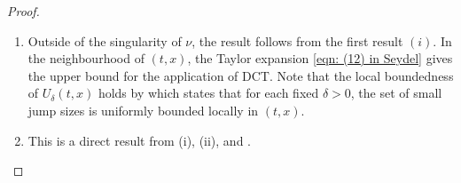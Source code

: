 \begin{proof}
\begin{enumerate}[label=(\roman*)]
        For the LSC case, we have
        \begin{align*}
            & \liminf_{k \rightarrow \infty} \mathcal{I}^{2,\delta}[t_k,x_k,p_k,v(t_k,\cdot)] \\
            &\quad =\liminf_{k \rightarrow \infty} \int\limits_{|z| \geq \delta} \big( v(t_k,x_k+\gamma(t_k,x_k,z)) - v(t_k,x_k) - \langle p_k, \gamma(t_k,x_k,z) \rangle \ind{|z| < 1} \big) \nu (\diff z) \\
            &\quad \geq \int\limits_{|z| \geq \delta} \liminf_{k \rightarrow \infty} \big( v(t_k,x_k+\gamma(t_k,x_k,z)) - v(t_k,x_k) - \langle p_k, \gamma(t_k,x_k,z) \rangle \ind{|z| < 1} \big) \nu(\diff z) \\
            &\quad = \int\limits_{|z| \geq \delta} \big( v(t,x+\gamma(t,x,z)) - v(t,z) - \langle p, \gamma(t,x,z) \rangle \ind{|z|>1} \big) \nu(\diff z) \\
            &\quad = \mathcal{I}^{2,\delta} [t,x,p,v(t,\cdot)]. 
        \end{align*}
        where the inequality results from the direct application of Fatou's Lemma. 

        For the second assertion, the result for $\varphi_k$ follows from the monotonous property of $\{\varphi_k\}_{k \geq 0}$ and the assumption that $\varphi_k$ converges pointwise to $u$. Applying Dini's Theorem, see {\cite[Theorem 7.3]{dibenedetto2002real}}, one finds that the convergence is uniform, which results in 
        \begin{equation*}
            \limsup_{k \rightarrow \infty} \varphi_k(t_k,x_k) \leq u(t,x),
        \end{equation*}
        and 
        \begin{equation*}
            \limsup_{k \rightarrow \infty} \varphi_k(t_k,x_k + \gamma(t_k,x_k,z)) \leq u(t,x).
        \end{equation*}
        Hence \eqref{eqn: (33) in Seydel} holds. A similar logic is applied to obtain \eqref{eqn: (34) in Seydel}. 

    \item Outside of the singularity of  $\nu$, the result follows from the first result $(i)$. In the neighbourhood of $(t,x)$, the Taylor expansion \eqref{eqn: (12) in Seydel} gives the upper bound for the application of DCT. Note that the local boundedness of $U_\delta(t,x)$ holds by  which states that for each fixed $\delta > 0$, the set of small jump sizes is uniformly bounded locally in $(t,x)$. 

    \item This is a direct result from (i), (ii), and . \hfill $\qedhere$
    \end{enumerate}
\end{proof}

